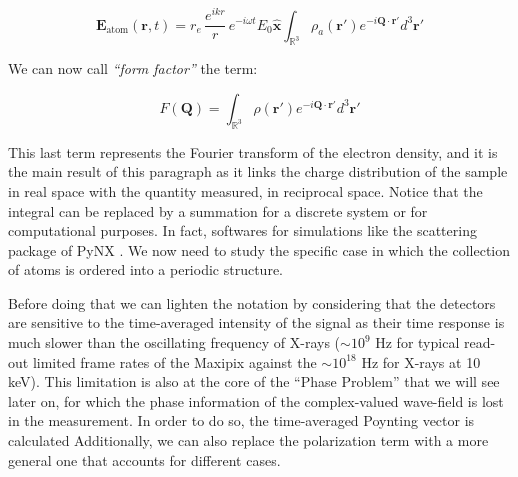 \begin{equation}
    \mathbf{E}_{\text{atom}}(\mathbf{r},t) 
    = r_e \, \frac{e^{ikr}}{r} \, e^{-i \omega t} 
    E_0 \mathbf{\hat{x}}
    \int_{\mathbb{R}^3} \rho_a(\mathbf r') e^{-i \mathbf{Q} \cdot \mathbf{r}'}  d^3 \mathbf r'
    \label{eq:scattering_eletron}
\end{equation}



We can now call \textit{``form factor''} the term: 

\begin{equation}
     F(\mathbf Q) = 
    \int_{\mathbb{R}^3} \rho(\mathbf r') e^{-i \mathbf{Q} \cdot \mathbf{r}'}  d^3 \mathbf r'
    \label{eq:formfactor}
\end{equation}

This last term represents the Fourier transform of the electron density, and it is the main result of this paragraph as it 
links the charge distribution of the sample in real space with the quantity measured, in reciprocal space. 
Notice that the integral can be replaced by a summation for a discrete system or for computational purposes. In fact, 
softwares for simulations like the scattering package of PyNX \cite{pynx_scattering}.
We now need to study the specific case in which the collection of atoms is ordered into a periodic structure. 

Before doing that we can lighten the notation by considering that the detectors are sensitive to the time-averaged intensity 
of the signal as their time response is much slower than the oscillating frequency of X-rays ($\sim 10^{9}$ Hz for typical 
read-out limited frame rates of the Maxipix 
\cite{ponchut_maxipix_2011} against the $\sim 10^{18}$ Hz for X-rays at 10 keV). This limitation is also at the core of 
the ``Phase Problem'' that we will see later on, for which the phase information of the complex-valued wave-field is 
lost in the measurement. 
In order to do so, the time-averaged Poynting vector is calculated 
Additionally, we can also replace the polarization term with a more general one that accounts for different cases. 


